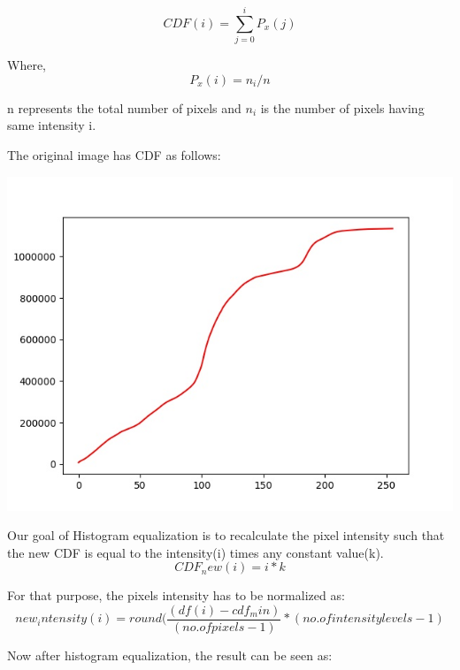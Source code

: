 \documentclass[12pt, a4paper, font = Times New Roman]{article}
\begin{document}
\begin{equation}
CDF(i) = \sum_{j=0}^{i}{P_x(j)}
\end{equation}
\par
Where,
\begin{equation}
P_x(i) = n_i/n
\end{equation}
\par
n represents the total number of pixels and $n_i$ is the number of pixels having same intensity i.
\par
\par
The original image has CDF as follows:

\begin{center}
\includegraphics[scale = 0.4]{CDF_1.jpg}
\label{CDF_1}
\end{center}

\par
Our goal of Histogram equalization is to recalculate the pixel intensity such that the new CDF is equal to the intensity(i) times any constant value(k).
\begin{equation}
CDF_new(i) = i*k
\end{equation}
\par
For that purpose, the pixels intensity has to be normalized as:
\begin{equation}
new_intensity(i) = round ( \frac{(df(i) - cdf_min)}{(no. of pixels -1)}  * (no. of intensity levels -1)
\end{equation}

\par
Now after histogram equalization, the result can be seen as:
\end{document}
